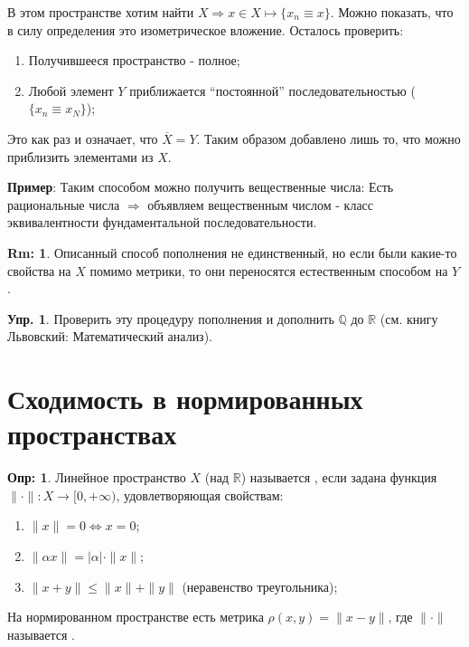 \documentclass[12pt]{article}
\newcommand{\MR}{\mathbb{R}}
\newcommand{\MQ}{\mathbb{Q}}
\theoremstyle{definition}
\newtheorem{defn}{Опр:}
\newtheorem{rem}{Rm:}
\newtheorem{exrc}{Упр.}
\begin{document}
В этом пространстве хотим найти $X \Rightarrow x \in X \mapsto \{x_n \equiv x\}$. Можно показать, что в силу определения это изометрическое вложение. Осталось проверить:
\begin{enumerate}
	\item Получившееся пространство - полное;
	\item Любой элемент $Y$ приближается ``постоянной'' последовательностью ($\{x_n \equiv x_N\}$);
\end{enumerate}
Это как раз и означает, что $\overline{X} = Y$. Таким образом добавлено лишь то, что можно приблизить элементами из $X$.

\textbf{Пример}: Таким способом можно получить вещественные числа: Есть рациональные числа $\Rightarrow$ объявляем вещественным числом - класс эквивалентности фундаментальной последовательности.

\begin{rem}
	Описанный способ пополнения не единственный, но если были какие-то свойства на $X$ помимо метрики, то они переносятся естественным способом на $Y$.
\end{rem}

\begin{exrc}
	Проверить эту процедуру пополнения и дополнить $\MQ$ до $\MR$ (см. книгу Львовский: Математический анализ).
\end{exrc}

\newpage
\section*{Сходимость в нормированных пространствах}

\begin{defn}
	Линейное пространство $X$ (над $\MR$) называется , если задана функция\\ $\|\cdot\| \colon X \to [0, +\infty)$, удовлетворяющая свойствам:
	\begin{enumerate}[label={\arabic*)}]
		\item $\|x\| = 0 \Leftrightarrow x = 0$;
		\item $\|\alpha x\| = |\alpha|\cdot\|x\|$;
		\item $\|x+y\| \leq \|x\| + \|y\|$ (неравенство треугольника);
	\end{enumerate}
\end{defn}
На нормированном пространстве есть метрика $\rho (x,y) = \|x - y\|$, где $\|\cdot\|$ называется . 
\end{document}

